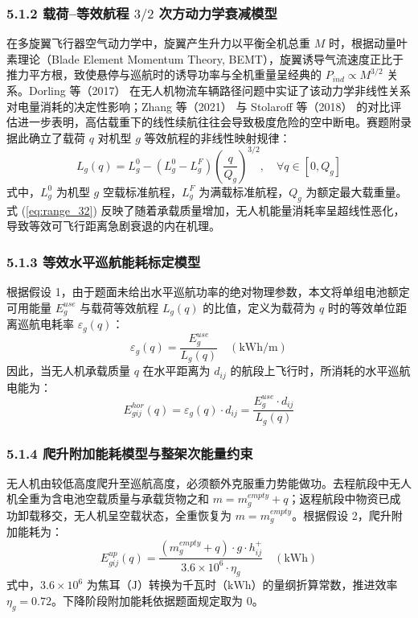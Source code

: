 \documentclass[withoutpreface,bwprint]{format}
\begin{document}
\subsubsection{\texorpdfstring{5.1.2 载荷--等效航程 $3/2$ 次方动力学衰减模型}{5.1.2 载荷--等效航程 3/2 次方动力学衰减模型}}
在多旋翼飞行器空气动力学中，旋翼产生升力以平衡全机总重 $M$ 时，根据动量叶素理论（Blade Element Momentum Theory, BEMT），旋翼诱导气流速度正比于推力平方根，致使悬停与巡航时的诱导功率与全机重量呈经典的 $P_{ind} \propto M^{3/2}$ 关系\cite{leishman2006}。Dorling 等（2017）\cite{dorling2017} 在无人机物流车辆路径问题中实证了该动力学非线性关系对电量消耗的决定性影响；Zhang 等（2021）\cite{zhang2021} 与 Stolaroff 等（2018）\cite{stolaroff2018} 的对比评估进一步表明，高估载重下的线性续航往往会导致极度危险的空中断电。赛题附录据此确立了载荷 $q$ 对机型 $g$ 等效航程的非线性映射规律：
\begin{equation}
L_g(q) = L_g^0 - (L_g^0 - L_g^F) \left(\frac{q}{Q_g}\right)^{3/2}, \quad \forall q \in [0, Q_g]
\label{eq:range_32}
\end{equation}
式中，$L_g^0$ 为机型 $g$ 空载标准航程，$L_g^F$ 为满载标准航程，$Q_g$ 为额定最大载重量。式 (\ref{eq:range_32}) 反映了随着承载质量增加，无人机能量消耗率呈超线性恶化，导致等效可飞行距离急剧衰退的内在机理。

\subsubsection{5.1.3 等效水平巡航能耗标定模型}
根据假设 1，由于题面未给出水平巡航功率的绝对物理参数，本文将单组电池额定可用能量 $E_g^{use}$ 与载荷等效航程 $L_g(q)$ 的比值，定义为载荷为 $q$ 时的等效单位距离巡航电耗率 $\varepsilon_g(q)$：
\begin{equation}
\varepsilon_g(q) = \frac{E_g^{use}}{L_g(q)} \quad (\text{kWh/m})
\end{equation}
因此，当无人机承载质量 $q$ 在水平距离为 $d_{ij}$ 的航段上飞行时，所消耗的水平巡航电能为：
\begin{equation}
E_{gij}^{hor}(q) = \varepsilon_g(q) \cdot d_{ij} = \frac{E_g^{use} \cdot d_{ij}}{L_g(q)}
\end{equation}

\subsubsection{5.1.4 爬升附加能耗模型与整架次能量约束}
无人机由较低高度爬升至巡航高度，必须额外克服重力势能做功。去程航段中无人机全重为含电池空载质量与承载货物之和 $m = m_g^{empty} + q$；返程航段中物资已成功卸载移交，无人机呈空载状态，全重恢复为 $m = m_g^{empty}$。根据假设 2，爬升附加能耗为：
\begin{equation}
E_{gij}^{up}(q) = \frac{(m_g^{empty} + q) \cdot g \cdot h_{ij}^+}{3.6 \times 10^6 \cdot \eta_g} \quad (\text{kWh})
\end{equation}
式中，$3.6 \times 10^6$ 为焦耳（$\text{J}$）转换为千瓦时（$\text{kWh}$）的量纲折算常数，推进效率 $\eta_g = 0.72$。下降阶段附加能耗依据题面规定取为 0。
\end{document}
